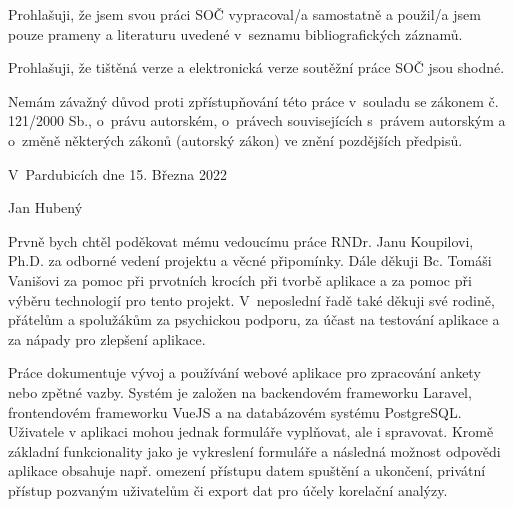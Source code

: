
\noindent Prohlašuji, že jsem svou práci SOČ vypracoval/a samostatně a použil/a jsem pouze prameny a literaturu uvedené v~seznamu bibliografických záznamů.

\noindent Prohlašuji, že tištěná verze a elektronická verze soutěžní práce SOČ jsou shodné.

\noindent Nemám závažný důvod proti zpřístupňování této práce v~souladu se zákonem č. 121/2000 Sb., o~právu autorském, o~právech souvisejících s~právem autorským a o~změně některých zákonů (autorský zákon) ve znění pozdějších předpisů.  

\vspace{24 pt}

\noindent V~Pardubicích dne 15. Března 2022 \dotfill{} 

\hspace{8cm} Jan Hubený

\cleardoublepage

\vspace*{0.8\textheight}

\noindent
Prvně bych chtěl poděkovat mému vedoucímu práce RNDr. Janu Koupilovi, Ph.D. za odborné vedení projektu a věcné připomínky. Dále děkuji Bc. Tomáši Vanišovi za pomoc při prvotních krocích při tvorbě aplikace a za pomoc při výběru technologií pro tento projekt. V~neposlední řadě také děkuji své rodině, přátelům a spolužákům za psychickou podporu, za účast na testování aplikace a za nápady pro zlepšení aplikace.

\cleardoublepage


\noindent 
Práce dokumentuje vývoj a používání webové aplikace pro zpracování ankety nebo zpětné vazby. Systém je založen na backendovém frameworku Laravel, frontendovém frameworku VueJS a na databázovém systému PostgreSQL. Uživatele v aplikaci mohou jednak formuláře vyplňovat, ale i spravovat. Kromě základní funkcionality jako je vykreslení formuláře a následná možnost odpovědi aplikace obsahuje např. omezení přístupu datem spuštění a ukončení, privátní přístup pozvaným uživatelům či export dat pro účely korelační analýzy.

\vspace{18pt}


